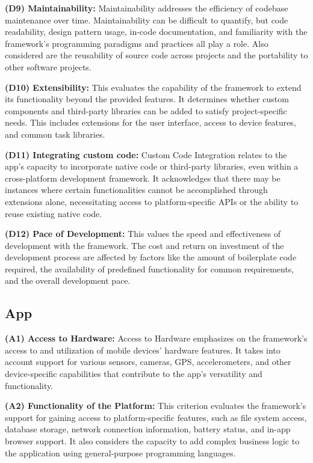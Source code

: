 \textbf{(D9) Maintainability:}
Maintainability addresses the efficiency of codebase maintenance over time. Maintainability can be difficult to quantify, but code readability, design pattern usage, in-code documentation, and familiarity with the framework's programming paradigms and practices all play a role. Also considered are the reusability of source code across projects and the portability to other software projects.

\textbf{(D10) Extensibility:}
This evaluates the capability of the framework to extend its functionality beyond the provided features. It determines whether custom components and third-party libraries can be added to satisfy project-specific needs. This includes extensions for the user interface, access to device features, and common task libraries.

\textbf{(D11) Integrating custom code:}
Custom Code Integration relates to the app's capacity to incorporate native code or third-party libraries, even within a cross-platform development framework. It acknowledges that there may be instances where certain functionalities cannot be accomplished through extensions alone, necessitating access to platform-specific APIs or the ability to reuse existing native code.

\textbf{(D12) Pace of Development:}
This values the speed and effectiveness of development with the framework. The cost and return on investment of the development process are affected by factors like the amount of boilerplate code required, the availability of predefined functionality for common requirements, and the overall development pace.

\subsection{App}
\textbf{(A1) Access to Hardware:}
Access to Hardware emphasizes on the framework's access to and utilization of mobile devices' hardware features. It takes into account support for various sensors, cameras, GPS, accelerometers, and other device-specific capabilities that contribute to the app's versatility and functionality.

\textbf{(A2) Functionality of the Platform:}
This criterion evaluates the framework's support for gaining access to platform-specific features, such as file system access, database storage, network connection information, battery status, and in-app browser support. It also considers the capacity to add complex business logic to the application using general-purpose programming languages.

